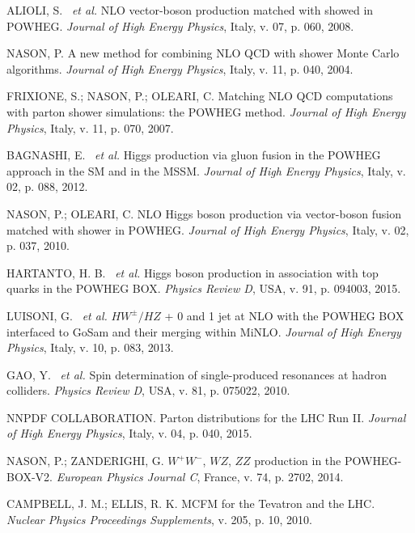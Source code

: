 \begin{thebibliography}{}
ALIOLI, S. ~\textit{et al.} NLO vector-boson production matched with showed in POWHEG. \textit{Journal of High Energy Physics}, Italy, v. 07, p. 060, 2008.
	
NASON, P. A new method for combining NLO QCD with shower Monte Carlo algorithms. \textit{Journal of High Energy Physics}, Italy, v. 11, p. 040, 2004.

FRIXIONE, S.; NASON, P.; OLEARI, C. Matching NLO QCD computations with parton shower simulations: the POWHEG method. \textit{Journal of High Energy Physics}, Italy, v. 11, p. 070, 2007.

BAGNASHI, E. ~\textit{et al.} Higgs production via gluon fusion in the POWHEG approach in the SM and in the MSSM. \textit{Journal of High Energy Physics}, Italy, v. 02, p. 088, 2012.

NASON, P.; OLEARI, C. NLO Higgs boson production via vector-boson fusion matched with shower in POWHEG. \textit{Journal of High Energy Physics}, Italy, v. 02, p. 037, 2010.

HARTANTO, H. B. ~\textit{et al.} Higgs boson production in association with top quarks in the POWHEG BOX. \textit{Physics Review D}, USA, v. 91, p. 094003, 2015.

LUISONI, G. ~\textit{et al.} $HW^{\pm}/HZ$ + 0 and 1 jet at NLO with the POWHEG BOX interfaced to GoSam and their merging within MiNLO. \textit{Journal of High Energy Physics}, Italy, v. 10, p. 083, 2013.

GAO, Y. ~\textit{et al.} Spin determination of single-produced resonances at hadron colliders. \textit{Physics Review D}, USA, v. 81, p. 075022, 2010.

NNPDF COLLABORATION. Parton distributions for the LHC Run II. \textit{Journal of High Energy Physics}, Italy, v. 04, p. 040, 2015.

NASON, P.; ZANDERIGHI, G. $W^{+}W^{-}$, $WZ$, $ZZ$ production in the POWHEG-BOX-V2. \textit{European Physics Journal C}, France, v. 74, p. 2702, 2014.

CAMPBELL, J. M.; ELLIS, R. K. MCFM for the Tevatron and the LHC. \textit{Nuclear Physics Proceedings Supplements}, v. 205, p. 10, 2010.


\end{thebibliography}
